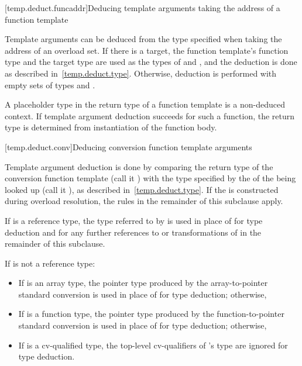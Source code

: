 [temp.deduct.funcaddr]{Deducing template arguments taking the address of a function template}

\pnum
Template arguments can be deduced from the type specified when taking
the address of an overload set.
If there is a target,
the function template's function type and the target type
are used as the types of
and
,
and the deduction is done as
described in~\ref{temp.deduct.type}.
Otherwise, deduction is performed with empty sets of types  and .

\pnum
A placeholder type in the return type of a
function template is a non-deduced context. If template argument
deduction succeeds for such a function, the return type is determined
from instantiation of the function body.

[temp.deduct.conv]{Deducing conversion function template arguments}

\pnum
Template argument deduction is done by comparing the return type of
the
conversion function template
(call it
)
with the type specified by the  of the
 being looked up
(call it ), as described in~\ref{temp.deduct.type}.
If the  is constructed during
overload resolution,
the rules in the remainder of this subclause apply.

\pnum
If  is a reference type, the type referred to by  is used in place
of  for type deduction and for any further references to or transformations of
 in the remainder of this subclause.

\pnum
If
is not a reference type:

\begin{itemize}
\item
If
is an array type, the pointer type produced by the
array-to-pointer standard conversion is used in place of
for type
deduction; otherwise,
\item
If
is a function type, the pointer type produced by the
function-to-pointer standard conversion is used in place of
for
type deduction; otherwise,
\item
If
is a cv-qualified type, the top-level cv-qualifiers of
's
type are ignored for type deduction.
\end{itemize}


